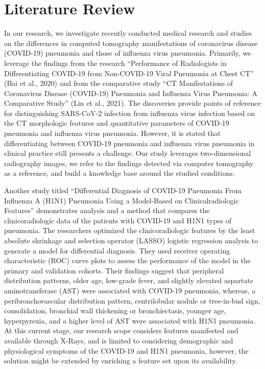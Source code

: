 \documentclass[12pt, twocolumn]{CUP-JNL-PPS}
\begin{document}
\section{Literature Review}
In our research, we investigate recently conducted medical research and
studies on the differences in computed tomography manifestations of coronavirus
disease (COVID-19) pneumonia and those of influenza virus pneumonia. Primarily, we leverage the findings from the research “Performance of Radiologists in Differentiating COVID-19 from Non-COVID-19 Viral Pneumonia at Chest
CT” (Bai et al., 2020) and from the comparative study “CT Manifestations of
Coronavirus Disease (COVID-19) Pneumonia and Influenza Virus Pneumonia: A
Comparative Study” (Lin et al., 2021). The discoveries provide points of reference
for distinguishing SARS-CoV-2 infection from influenza virus infection based on
the CT morphologic features and quantitative parameters of COVID-19 pneumonia
and influenza virus pneumonia. However, it is stated that differentiating between
COVID-19 pneumonia and influenza virus pneumonia in clinical practice still
presents a challenge. Our study leverages two-dimensional radiography images,
we refer to the findings detected via computer tomography as a reference, and
build a knowledge base around the studied conditions.

Another study titled “Differential Diagnosis of COVID-19 Pneumonia
From Influenza A (H1N1) Pneumonia Using a Model-Based on Clinicalradiologic
Features” demonstrates analysis and a method that compares the clinicoradiologic
data of the patients with COVID-19 and H1N1 types of pneumonia. The researchers optimized the clinicoradiologic features by the least absolute shrinkage
and selection operator (LASSO) logistic regression analysis to generate a model
for differential diagnosis. They used receiver operating characteristic (ROC) curve
plots to assess the performance of the model in the primary and validation cohorts.
Their findings suggest that peripheral distribution patterns, older age, low-grade
fever, and slightly elevated aspartate aminotransferase (AST) were associated with
COVID-19 pneumonia, whereas, a peribronchovascular distribution pattern, centrilobular nodule or tree-in-bud sign, consolidation, bronchial wall thickening or
bronchiectasis, younger age, hyperpyrexia, and a higher level of AST were associated with H1N1 pneumonia. At this current stage, our research scope considers
features manifested and available through X-Rays, and is limited to considering
demographic and physiological symptoms of the COVID-19 and H1N1 pneumonia, however, the solution might be extended by enriching a feature set upon its
availability.
\end{document}
